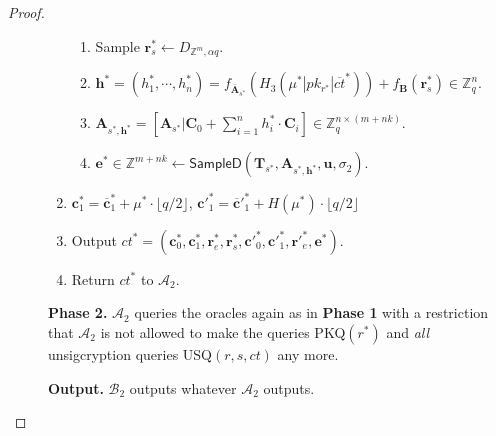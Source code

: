 \documentclass[a4paper,11pt,onecolumn]{elsarticle}
\begin{document}
\begin{proof}
\begin{description}
\begin{enumerate}
\begin{enumerate}
			\item 	Sample $\textbf{r}^*_s \leftarrow D_{\mathbb{Z}^{m}, \alpha q}$.
			\item $\textbf{h}^*=(h^*_1, \cdots, h^*_n)=f_{\overline{\textbf{A}}_{s^*}}(H_3(\mu^*| pk_{r^*}|\overline{ct}^*))+f_{\textbf{B}}(\textbf{r}^*_{s})\in \mathbb{Z}_q^{n}$.
			\item $\textbf{A}_{s^*,\textbf{h}^*}=[\mathbf{A}_{s^*}|\mathbf{C}_0+\sum_{i=1}^{n}h^*_i\cdot \mathbf{C}_i]\in \mathbb{Z}_q^{n \times (m+nk)}$.
			\item $\textbf{e}^* \in \mathbb{Z}^{m+nk} \leftarrow \textsf{SampleD}(\textbf{T}_{s^*}, \textbf{A}_{s^*,\textbf{h}^*},\textbf{u},\sigma_2)$.
										\end{enumerate}
			\item  $\textbf{c}^*_1=\overline{\textbf{c}}^*_1+ \mu^* \cdot \lfloor q/2\rfloor$, \quad  $\textbf{c}'^*_1=\overline{\textbf{c}}'^*_1+ H(\mu^*) \cdot \lfloor q/2\rfloor$	
					\item Output $ct^*=(\textbf{c}^*_0, \textbf{c}^*_1, \textbf{r}^*_{e},\textbf{r}^*_{s},\textbf{c}'^*_0, \textbf{c}'^*_1,\textbf{r}'^*_e, \textbf{e}^*)$.
							\item Return $ct^*$ to $\mathcal{A}_2$.
				
						\end{enumerate}
			
				
				\textbf{Phase 2.} $\mathcal{A}_2$ queries the oracles again as in \textbf{Phase 1} with a restriction that $\mathcal{A}_2$ is not allowed to make the queries PKQ$(r^*)$ and \textit{all} unsigcryption queries   USQ$(r,s, ct)$ any more.
				
				\textbf{Output.} $\mathcal{B}_2$ outputs whatever $\mathcal{A}_2$  outputs.
				
			\fi	
			\end{description}
			
	
			
		\end{proof}                   
		
\end{document}
